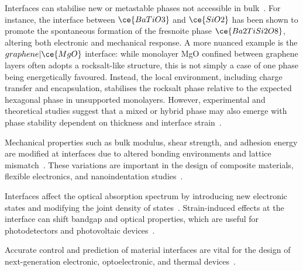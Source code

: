 \label{interface_stabilise_metastable_phases} Interfaces can stabilise new or metastable phases not accessible in bulk~\cite{raffle_paper, Schusteritsch2015-lw}.
For instance, the interface between $\ce{BaTiO3}$ and $\ce{SiO2}$ has been shown to promote the spontaneous formation of the fresnoite phase $\ce{Ba2TiSi2O8}$, altering both electronic and mechanical response.
A more nuanced example is the $graphene|\ce{MgO}$ interface: while monolayer MgO confined between graphene layers often adopts a rocksalt-like structure, this is not simply a case of one phase being energetically favoured.
Instead, the local environment, including charge transfer and encapsulation, stabilises the rocksalt phase relative to the expected hexagonal phase in unsupported monolayers.
However, experimental and theoretical studies suggest that a mixed or hybrid phase may also emerge with phase stability dependent on thickness and interface strain~\cite{Pitfield2024-ra}.

\newpage \label{interface_mechanical_properties} Mechanical properties such as bulk modulus, shear strength, and adhesion energy are modified at interfaces due to altered bonding environments and lattice mismatch~\nocite{}.
These variations are important in the design of composite materials, flexible electronics, and nanoindentation studies~\cite{Zhang2016-lt, Leung2020-tv, Davies2024-ju}.

\label{interface_optical_effects} Interfaces affect the optical absorption spectrum by introducing new electronic states and modifying the joint density of states~\nocite{}.
Strain-induced effects at the interface can shift bandgap and optical properties, which are useful for photodetectors and photovoltaic devices~\cite{Chagarov2015-ol, Low2025-on}.

\label{interface_summary} Accurate control and prediction of material interfaces are vital for the design of next-generation electronic, optoelectronic, and thermal devices~\cite{Low2025-on}.

\label{interface_functional_regions} %

